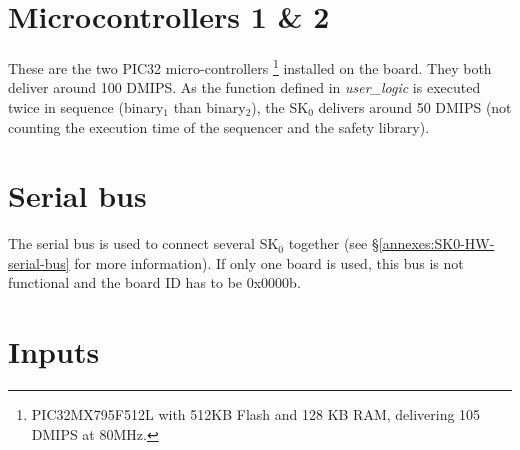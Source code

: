 \section{Microcontrollers 1 \& 2}

These are the two PIC32 micro-controllers \footnote{PIC32MX795F512L with 512KB Flash and 128 KB RAM, delivering 105 DMIPS at 80MHz.} installed on the board. They both deliver around 100 DMIPS. As the function defined in \textit{user\_logic} is executed twice in sequence (binary$_1$ than binary$_2$), the SK$_0$ delivers around 50 DMIPS (not counting the execution time of the sequencer and the safety library).

\section{Serial bus}

The serial bus is used to connect several SK$_0$ together (see \S\ref{annexes:SK0-HW-serial-bus} for more information). If only one board is used, this bus is not functional and the board ID has to be 0x0000b.

\section{Inputs}

